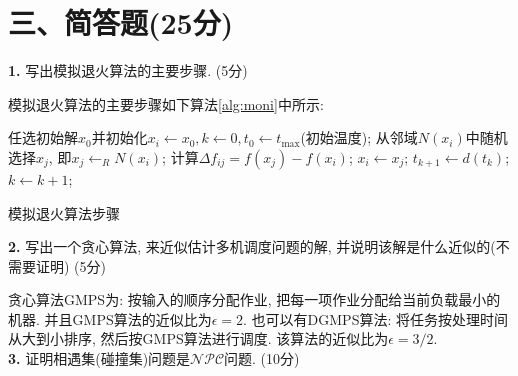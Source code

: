 \documentclass{article}
\begin{document}
\section{三、简答题(25分)}

\textbf{1.} 写出模拟退火算法的主要步骤. (5分)

\solution 模拟退火算法的主要步骤如下算法\ref{alg:moni}中所示:
    \begin{algorithm}[H]
		\begin{algorithmic}[1]
        \State 任选初始解$x_0$并初始化$x_i\gets x_0,k\gets 0, t_0\gets t_{\text{max}}$(初始温度);
            \State 从邻域$N(x_i)$中随机选择$x_j$, 即$x_j\gets _RN(x_i)$;
            \State 计算$\Delta f_{ij}=f(x_j)-f(x_i)$;
                \State $x_i\gets x_j$;
            \EndIf
            \State $t_{k+1}\gets d(t_k)$;
            \State $ k\gets k+1$;
        \EndWhile
		\end{algorithmic}
		\caption{模拟退火算法步骤}
		\label{alg:moni}
	\end{algorithm}

\textbf{2.} 写出一个贪心算法, 来近似估计多机调度问题的解, 并说明该解是什么近似的(不需要证明) (5分)

\solution 贪心算法GMPS为: 按输入的顺序分配作业, 把每一项作业分配给当前负载最小的机器. 并且GMPS算法的近似比为$\epsilon = 2$. 也可以有DGMPS算法: 将任务按处理时间从大到小排序, 然后按GMPS算法进行调度. 该算法的近似比为$\epsilon =3/2$.
\\

\textbf{3.} 证明相遇集(碰撞集)问题是$\mathcal{NPC}$问题. (10分)
\end{document}
